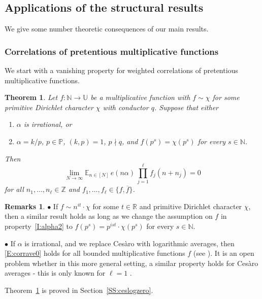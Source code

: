 \documentclass[11pt]{amsart}
\newtheorem{theorem}[lemma]{Theorem}
\theoremstyle{definition}
\newtheorem*{remarks}{Remarks}
\newcommand{\E}{{\mathbb E}}
\newcommand{\N}{{\mathbb N}}
\renewcommand{\P}{{\mathbb P}}
\newcommand{\R}{{\mathbb R}}
\newcommand{\Z}{{\mathbb Z}}
\newcommand{\U}{{\mathbb U}}
\begin{document}




\subsection{Applications of the structural results}
We give some number theoretic consequences of our main results.
\subsubsection{Correlations of pretentious multiplicative functions}
We start with a vanishing property for  weighted correlations of pretentious multiplicative functions.
\begin{theorem}\label{T:ceslogzero}
	Let $f\colon \N\to \U$ be a multiplicative function with  $f\sim  \chi$ for some primitive  Dirichlet character $\chi$ with conductor $q$.
	Suppose that either
	\begin{enumerate}
		\item\label{I:alpha1}  $\alpha$ is irrational, or
		
		\smallskip
		
		\item \label{I:alpha2}  $\alpha=k/p$, $p\in \P$, $(k,p)=1$, $p\nmid q$,  and $f(p^s)=\chi(p^s)$ for every $s\in \N$.
	\end{enumerate}
	Then
	\begin{equation}\label{E:corrave0}
		\lim_{N\to\infty} \E_{n\in [N]}\, e(n\alpha)\, \prod_{j=1}^\ell f_j(n+n_j)=0
	\end{equation}
	for all  $n_1,\ldots, n_\ell \in \Z$ and $f_1,\ldots, f_\ell\in \{f,\overline{f}\}$.
\end{theorem}
\begin{remarks}
$\bullet$
 If  $f\sim n^{it}\cdot \chi$ for some $t\in \R$ and primitive Dirichlet character $\chi$, then a similar result holds as long as we change the  assumption on $f$ in  property~\eqref{I:alpha2}
 to  $f(p^s)=p^{ist}\cdot \chi(p^s)$ for every $s\in \N$.

$\bullet$ If $\alpha$ is irrational, and we replace Ces\`aro with logarithmic averages, then  \eqref{E:corrave0}  holds for all bounded multiplicative functions
$f$ (see \cite[Corollary~1.4]{FH21}). It is an open problem whether in this more general setting,  a similar property holds for Ces\`aro averages -  this  is only known for $\ell=1$ \cite{D75,DD74}.
\end{remarks}
Theorem~\ref{T:ceslogzero} is proved in  Section~\ref{SS:ceslogzero}.
\end{document}
